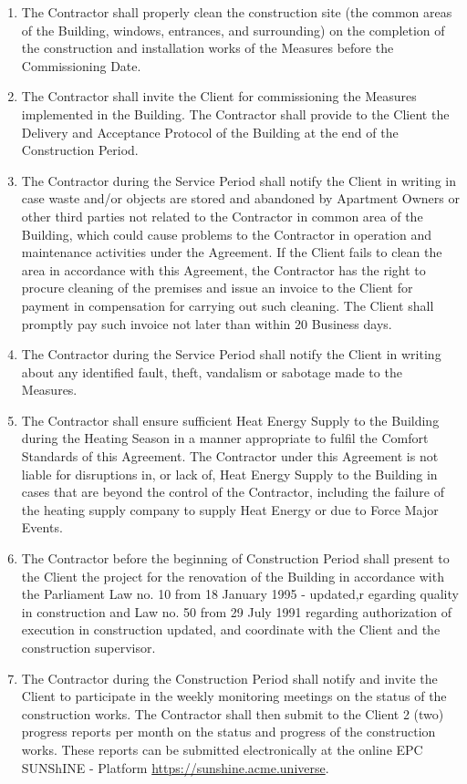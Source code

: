 \begin{multicols}{2}
\begin{enumerate}
	\item The Contractor shall properly clean the construction site (the common areas of the Building, windows, entrances, and surrounding) on the completion of the construction and installation works of the Measures before the Commissioning Date.
	\item The Contractor shall invite the Client for commissioning the Measures implemented in the Building. The Contractor shall provide to the Client the Delivery and Acceptance Protocol of the Building at the end of the Construction Period.
	\item The Contractor during the Service Period shall notify the Client in writing in case waste and/or objects are stored and abandoned by Apartment Owners or other third parties not related to the Contractor in common area of the Building, which could cause problems to the Contractor in operation and maintenance activities under the Agreement. If the Client fails to clean the area in accordance with this Agreement, the Contractor has the right to procure cleaning of the premises and issue an invoice to the Client for payment in compensation for carrying out such cleaning. The Client shall promptly pay such invoice not later than within 20 Business days.
	\item The Contractor during the Service Period shall notify the Client in writing about any identified fault, theft, vandalism or sabotage made to the Measures.
	\item The Contractor shall ensure sufficient Heat Energy Supply to the Building during the Heating Season in a manner appropriate to fulfil the Comfort Standards of this Agreement. The Contractor under this Agreement is not liable for disruptions in, or lack of, Heat Energy Supply to the Building in cases that are beyond the control of the Contractor, including the failure of the heating supply company to supply Heat Energy or due to Force Major Events.
	\item The Contractor before the beginning of Construction Period shall present to the Client the project for the renovation of the Building in accordance with the Parliament Law no. 10 from 18 January 1995 - updated,r egarding quality in construction and Law no. 50 from 29 July 1991 regarding authorization of execution in construction updated, and coordinate with the Client and the construction supervisor.
	\item The Contractor during the Construction Period shall notify and invite the Client to participate in the weekly monitoring meetings on the status of the construction works. The Contractor shall then submit to the Client 2 (two) progress reports per month on the status and progress of the construction works. These reports can be submitted electronically at the online EPC SUNShINE - Platform \url{https://sunshine.acme.universe}.

\end{enumerate}
\end{multicols}
